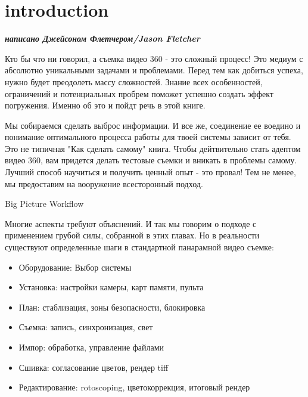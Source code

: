 
\SkipTocEntry\section*{introduction}
\addtocounter{section}{2}
\begin{fullwidth}

{\itshape\bfseries написано Джейсоном Флетчером/Jason Fletcher

}

Кто бы что ни говорил, а съемка видео 360 - это сложный процесс! Это медиум с абсолютно уникальными задачами и проблемами. Перед тем как добиться успеха, нужно будет преодолеть массу сложностей.  Знание всех особенностей, ограничений и потенциальных пробрем поможет успешно создать эффект погружения. Именно об это и пойдт речь в этой книге.

Мы собираемся сделать выброс информации. И все же, соединение ее воедино и понимание оптимального процесса работы для твоей системы зависит от тебя. Это не типичная "Как сделать самому" книга. Чтобы дейтвительно стать адептом видео 360, вам придется делать тестовые съемки и вникать в проблемы самому. Лучший способ научиться и получить ценный опыт - это провал! Тем не менее, мы предоставим на вооружение всесторонный подход.

{\large Big Picture Workflow\par}

Многие аспекты требуют объяснений. И так мы говорим о подходе с применением грубой силы, собранной в этих главах. Но в реальности существуют определенные шаги в стандартной панарамной видео съемке:

\begin{itemize}
\item Оборудование: Выбор системы
\item Установка: настройки камеры, карт памяти, пульта
\item План: стаблизация, зоны безопасности, блокировка
\item Съемка: запись, синхронизация, свет
\item Импор: обработка, управление файлами 
\item Сшивка: согласование цветов, рендер tiff
\item Редактирование: rotoscoping, цветокоррекция, итоговый рендер
\end{itemize}

\clearpage
\end{fullwidth}
